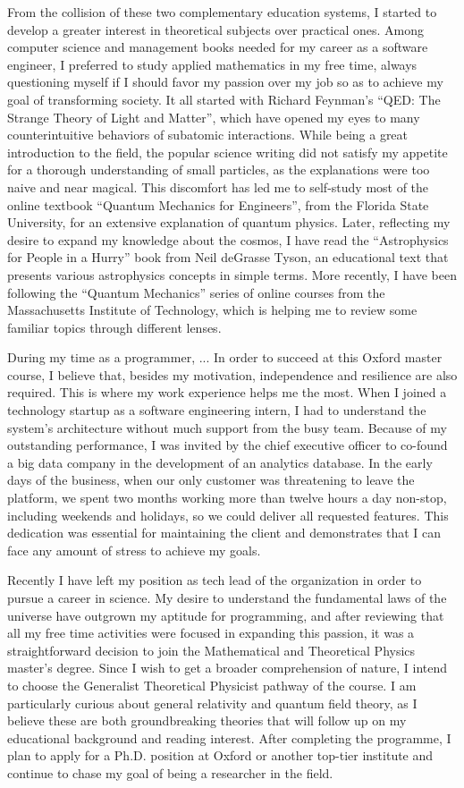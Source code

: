 \documentclass[10pt]{article}
\newcommand*{\NEWLINE}{\vspace{0.75em}}
\begin{document}
From the collision of these two complementary education systems, I started to develop a greater interest in theoretical subjects over practical ones. Among computer science and management books needed for my career as a software engineer, I preferred to study applied mathematics in my free time, always questioning myself if I should favor my passion over my job so as to achieve my goal of transforming society. It all started with Richard Feynman's ``QED: The Strange Theory of Light and Matter'', which have opened my eyes to many counterintuitive behaviors of subatomic interactions. While being a great introduction to the field, the popular science writing did not satisfy my appetite for a thorough understanding of small particles, as the explanations were too naive and near magical. This discomfort has led me to self-study most of the online textbook ``Quantum Mechanics for Engineers'', from the Florida State University, for an extensive explanation of quantum physics. Later, reflecting my desire to expand my knowledge about the cosmos, I have read the ``Astrophysics for People in a Hurry'' book from Neil deGrasse Tyson, an educational text that presents various astrophysics concepts in simple terms. More recently, I have been following the ``Quantum Mechanics'' series of online courses from the Massachusetts Institute of Technology, which is helping me to review some familiar topics through different lenses.
\NEWLINE{}

During my time as a programmer, ...
In order to succeed at this Oxford master course, I believe that, besides my motivation, independence and resilience are also required. This is where my work experience helps me the most. When I joined a technology startup as a software engineering intern, I had to understand the system's architecture without much support from the busy team. Because of my outstanding performance, I was invited by the chief executive officer to co-found a big data company in the development of an analytics database. In the early days of the business, when our only customer was threatening to leave the platform, we spent two months working more than twelve hours a day non-stop, including weekends and holidays, so we could deliver all requested features. This dedication was essential for maintaining the client and demonstrates that I can face any amount of stress to achieve my goals. \NEWLINE{}

Recently I have left my position as tech lead of the organization in order to pursue a career in science. My desire to understand the fundamental laws of the universe have outgrown my aptitude for programming, and after reviewing that all my free time activities were focused in expanding this passion, it was a straightforward decision to join the Mathematical and Theoretical Physics master's degree. Since I wish to get a broader comprehension of nature, I intend to choose the Generalist Theoretical Physicist pathway of the course. I am particularly curious about general relativity and quantum field theory, as I believe these are both groundbreaking theories that will follow up on my educational background and reading interest. After completing the programme, I plan to apply for a Ph.D. position at Oxford or another top-tier institute and continue to chase my goal of being a researcher in the field.
\end{document}
